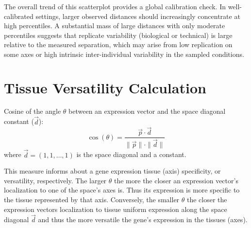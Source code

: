 \documentclass{article}
\begin{document}
The overall trend of this scatterplot provides a global calibration check. In well-calibrated settings, larger observed distances should increasingly concentrate at high percentiles. A substantial mass of large distances with only moderate percentiles suggests that replicate variability (biological or technical) is large relative to the measured separation, which may arise from low replication on some axes or high intrinsic inter-individual variability in the sampled conditions.

\section{Tissue Versatility Calculation}
Cosine of the angle $\theta$ between an expression vector and the space
diagonal constant ($\vec{d}$):
\[
    \cos(\theta) = \frac{\vec{p} \cdot \vec{d}}{\|\vec{p}\| \cdot \|\vec{d}\|}
\]
where \( \vec{d} = (1, 1, \dots, 1) \) is the space diagonal and a constant.

This measure informs about a gene expression tissue (axis) specificity, or
versatility, respectively. The larger $\theta$ the more the closer an
expression vector's localization to one of the space's axes is. Thus its
expression is more specific to the tissue represented by that axis. Conversely,
the smaller $\theta$ the closer the expression vectors localization to tissue
uniform expression along the space diagonal $\vec{d}$ and thus the more
versatile the gene's expression in the tissues (axes).
\end{document}
